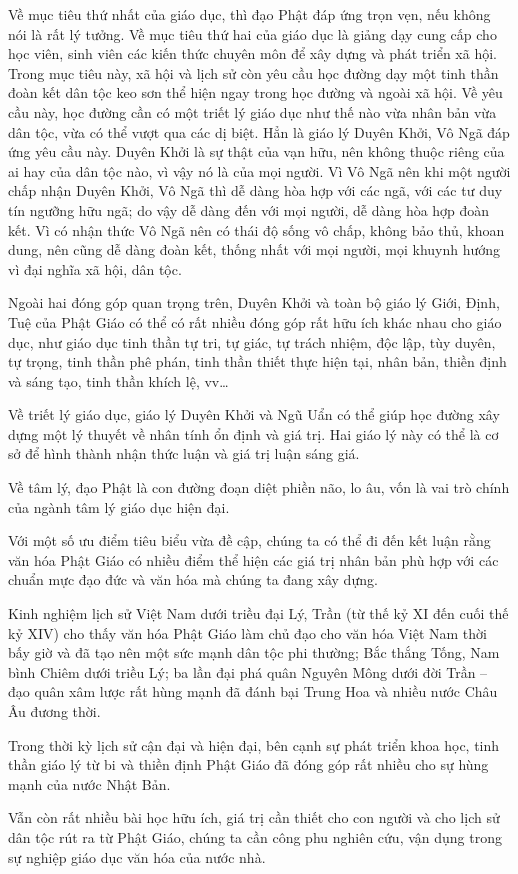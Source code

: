 Về mục tiêu thứ nhất của giáo dục, thì đạo Phật đáp ứng trọn vẹn, nếu không nói là rất lý tưởng. Về mục tiêu thứ hai của giáo dục là giảng dạy cung cấp cho học viên, sinh viên các kiến thức chuyên môn để xây dựng và phát triển xã hội. Trong mục tiêu này, xã hội và lịch sử còn yêu cầu học đường dạy một tinh thần đoàn kết dân tộc keo sơn thể hiện ngay trong học đường và ngoài xã hội. Về yêu cầu này, học đường cần có một triết lý giáo dục như thế nào vừa nhân bản vừa dân tộc, vừa có thể vượt qua các dị biệt. Hẳn là giáo lý Duyên Khởi, Vô Ngã đáp ứng yêu cầu này. Duyên Khởi là sự thật của vạn hữu, nên không thuộc riêng của ai hay của dân tộc nào, vì vậy nó là của mọi người. Vì Vô Ngã nên khi một người chấp nhận Duyên Khởi, Vô Ngã thì dễ dàng hòa hợp với các ngã, với các tư duy tín ngưỡng hữu ngã; do vậy dễ dàng đến với mọi người, dễ dàng hòa hợp đoàn kết. Vì có nhận thức Vô Ngã nên có thái độ sống vô chấp, không bảo thủ, khoan dung, nên cũng dễ dàng đoàn kết, thống nhất với mọi người, mọi khuynh hướng vì đại nghĩa xã hội, dân tộc.

Ngoài hai đóng góp quan trọng trên, Duyên Khởi và toàn bộ giáo lý Giới, Định, Tuệ của Phật Giáo có thể có rất nhiều đóng góp rất hữu ích khác nhau cho giáo dục, như giáo dục tinh thần tự tri, tự giác, tự trách nhiệm, độc lập, tùy duyên, tự trọng, tinh thần phê phán, tinh thần thiết thực hiện tại, nhân bản, thiền định và sáng tạo, tinh thần khích lệ, vv\ldots

Về triết lý giáo dục, giáo lý Duyên Khởi và Ngũ Uẩn có thể giúp học đường xây dựng một lý thuyết về nhân tính ổn định và giá trị. Hai giáo lý này có thể là cơ sở để hình thành nhận thức luận và giá trị luận sáng giá.

Về tâm lý, đạo Phật là con đường đoạn diệt phiền não, lo âu, vốn là vai trò chính của ngành tâm lý giáo dục hiện đại.

Với một số ưu điểm tiêu biểu vừa đề cập, chúng ta có thể đi đến kết luận rằng văn hóa Phật Giáo có nhiều điểm thể hiện các giá trị nhân bản phù hợp với các chuẩn mực đạo đức và văn hóa mà chúng ta đang xây dựng.

Kinh nghiệm lịch sử Việt Nam dưới triều đại Lý, Trần (từ thế kỷ XI đến cuối thế kỷ XIV) cho thấy văn hóa Phật Giáo làm chủ đạo cho văn hóa Việt Nam thời bấy giờ và đã tạo nên một sức mạnh dân tộc phi thường; Bắc thắng Tống, Nam bình Chiêm dưới triều Lý; ba lần đại phá quân Nguyên Mông dưới đời Trần -- đạo quân xâm lược rất hùng mạnh đã đánh bại Trung Hoa và nhiều nước Châu Âu đương thời.

Trong thời kỳ lịch sử cận đại và hiện đại, bên cạnh sự phát triển khoa học, tinh thần giáo lý từ bi và thiền định Phật Giáo đã đóng góp rất nhiều cho sự hùng mạnh của nước Nhật Bản.

Vẫn còn rất nhiều bài học hữu ích, giá trị cần thiết cho con người và cho lịch sử dân tộc rút ra từ Phật Giáo, chúng ta cần công phu nghiên cứu, vận dụng trong sự nghiệp giáo dục văn hóa của nước nhà.


